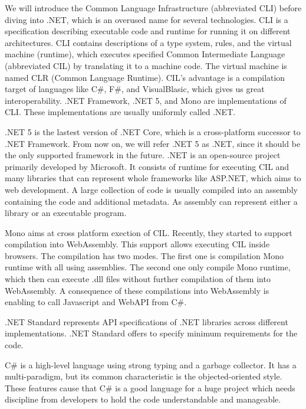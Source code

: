 We will introduce the Common Language Infrastructure (abbreviated CLI) \cite{online:cliWiki} before diving into .NET, which is an overused name for several technologies.
CLI is a specification describing executable code and runtime for running it on different architectures.
CLI contains descriptions of a type system, rules, and the virtual machine (runtime), which executes specified Common Intermediate Language (abbreviated CIL) by translating it to a machine code. 
The virtual machine is named CLR (Common Language Runtime).
CIL's advantage is a compilation target of languages like C\#, F\#, and VisualBlasic, which gives us great interoperability.
.NET Framework, .NET 5, and Mono are implementations of CLI.
These implementations are usually uniformly called .NET.
\par
.NET 5 \cite{online:netcoreWiki} is the lastest version of .NET Core, which is a cross-platform successor to .NET Framework.
From now on, we will refer .NET 5 as .NET, since it should be the only supported framework in the future.
.NET is an open-source project primarily developed by Microsoft.
It consists of runtime for executing CIL and many libraries that can represent whole frameworks like ASP.NET, which aims to web development.
A large collection of code is usually compiled into an assembly containing the code and additional metadata.
As assembly can represent either a library or an executable program.
\par
Mono aims at cross platform exection of CIL. 
Recently, they started to support compilation \cite{online:monoCompilation} into WebAssembly.
This support allows executing CIL inside browsers.
The compilation has two modes.
The first one is compilation Mono runtime with all using assemblies.
The second one only compile Mono runtime, which then can execute .dll files without further compilation of them into WebAssembly.
A consequence of these compilations into WebAssembly is enabling to call Javascript and WebAPI from C\#.
\par
.NET Standard represents API specifications of .NET libraries across different implementations.
.NET Standard offers to specify minimum requirements for the code.
\par
C\# is a high-level language using strong typing and a garbage collector.
It has a multi-paradigm, but its common characteristic is the objected-oriented style.
These features cause that C\# is a good language for a huge project which needs discipline from developers to hold the code understandable and manageable.

